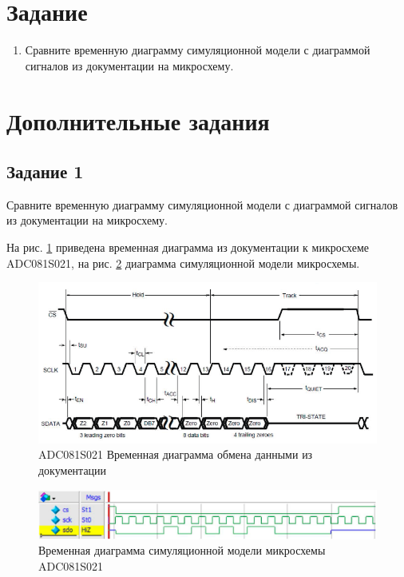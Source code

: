 \documentclass[a4paper,14pt]{article}
\begin{document}
	
	\tableofcontents
	\pagebreak
	\section{Задание}
	
	\begin{enumerate}
		\item Сравните временную диаграмму симуляционной модели с диаграммой сигналов из документации на микросхему.
		
		
	\end{enumerate}
	
	\section{Дополнительные задания}
	
	\subsection{Задание 1}
	
	Сравните временную диаграмму симуляционной модели с	диаграммой сигналов из документации на микросхему. 		
	
	На рис. \ref{fig:9.7} приведена временная диаграмма из документации к микросхеме ADC081S021, на рис. \ref{fig:9.11} диаграмма симуляционной модели микросхемы.
	
	\begin{figure}[H]
		\centering
		\includegraphics[width=0.9\linewidth]{images/9_7}
		\caption{ADC081S021 Временная диаграмма обмена данными из документации}
		\label{fig:9.7}
	\end{figure}
	
	
	\begin{figure}[H]
		\centering
		\includegraphics[width=0.9\linewidth]{images/9_11}
		\caption{Временная диаграмма симуляционной модели микросхемы ADC081S021}
		\label{fig:9.11}
	\end{figure}
\end{document}
